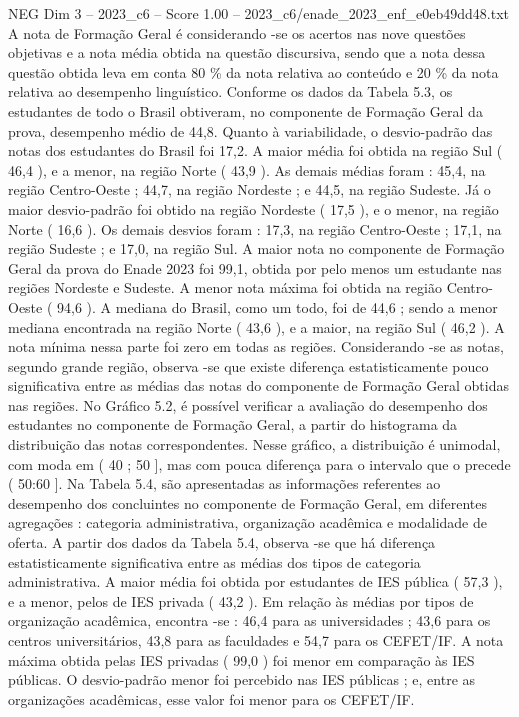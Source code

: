 \begin{textsample}{NEG Dim 3 – 2023\_c6 – Score 1.00 – 2023\_c6/enade\_2023\_enf\_e0eb49dd48.txt}
A nota de Formação Geral é considerando -se os acertos nas nove questões objetivas e a nota média obtida na questão discursiva, sendo que a nota dessa questão obtida leva em conta 80 \% da nota relativa ao conteúdo e 20 \% da nota relativa ao desempenho linguístico.
Conforme os dados da Tabela 5.3, os estudantes de todo o Brasil obtiveram, no componente de Formação Geral da prova, desempenho médio de 44,8.
Quanto à variabilidade, o desvio-padrão das notas dos estudantes do Brasil foi 17,2.
A maior média foi obtida na região Sul ( 46,4 ), e a menor, na região Norte ( 43,9 ).
As demais médias foram : 45,4, na região Centro-Oeste ; 44,7, na região Nordeste ; e 44,5, na região Sudeste.
Já o maior desvio-padrão foi obtido na região Nordeste ( 17,5 ), e o menor, na região Norte ( 16,6 ).
Os demais desvios foram : 17,3, na região Centro-Oeste ; 17,1, na região Sudeste ; e 17,0, na região Sul.
A maior nota no componente de Formação Geral da prova do Enade 2023 foi 99,1, obtida por pelo menos um estudante nas regiões Nordeste e Sudeste.
A menor nota máxima foi obtida na região Centro-Oeste ( 94,6 ).
A mediana do Brasil, como um todo, foi de 44,6 ; sendo a menor mediana encontrada na região Norte ( 43,6 ), e a maior, na região Sul ( 46,2 ).
A nota mínima nessa parte foi zero em todas as regiões.
Considerando -se as notas, segundo grande região, observa -se que existe diferença estatisticamente pouco significativa entre as médias das notas do componente de Formação Geral obtidas nas regiões.
No Gráfico 5.2, é possível verificar a avaliação do desempenho dos estudantes no componente de Formação Geral, a partir do histograma da distribuição das notas correspondentes.
Nesse gráfico, a distribuição é unimodal, com moda em ( 40 ; 50 ], mas com pouca diferença para o intervalo que o precede ( 50:60 ].
Na Tabela 5.4, são apresentadas as informações referentes ao desempenho dos concluintes no componente de Formação Geral, em diferentes agregações : categoria administrativa, organização acadêmica e modalidade de oferta.
A partir dos dados da Tabela 5.4, observa -se que há diferença estatisticamente significativa entre as médias dos tipos de categoria administrativa.
A maior média foi obtida por estudantes de IES pública ( 57,3 ), e a menor, pelos de IES privada ( 43,2 ).
Em relação às médias por tipos de organização acadêmica, encontra -se : 46,4 para as universidades ; 43,6 para os centros universitários, 43,8 para as faculdades e 54,7 para os CEFET/IF.
A nota máxima obtida pelas IES privadas ( 99,0 ) foi menor em comparação às IES públicas.
O desvio-padrão menor foi percebido nas IES públicas ; e, entre as organizações acadêmicas, esse valor foi menor para os CEFET/IF.

\end{textsample}
